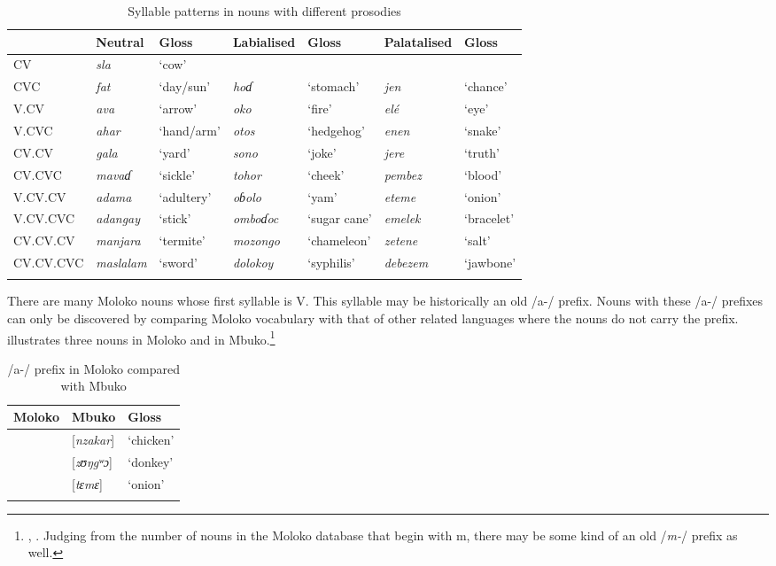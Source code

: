\begin{sidewaystable}
\caption{Syllable patterns in nouns with different prosodies\label{tab:4.24}}
\begin{tabular}{lllllll} \lsptoprule & {Neutral  } & {Gloss} & {Labialised} & {Gloss} & {Palatalised} & {Gloss}\\\midrule
{CV} & \textit{sla} & ‘cow’ &  &  &  & \\
{CVC} & \textit{fat} & ‘day/sun’ & \textit{hoɗ} & ‘stomach’ & \textit{jen} & ‘chance’\\
{V.CV} & \textit{ava} & ‘arrow’ & \textit{oko} & ‘fire’ & \textit{el\'{e}} & ‘eye’\\
{V.CVC} & \textit{ahar} & ‘hand/arm’ & \textit{otos} & ‘hedgehog’ & \textit{enen} & ‘snake’\\
{CV.CV} & \textit{gala} & ‘yard’ & \textit{sono} & ‘joke’ & \textit{jere} & ‘truth’\\
{CV.CVC} & \textit{mavaɗ} & ‘sickle’ & \textit{tohor} & ‘cheek’ & \textit{pembez} & ‘blood’\\
{V.CV.CV} & \textit{adama} & ‘adultery’ & \textit{oɓolo} & ‘yam’ & \textit{eteme} & ‘onion’\\
{V.CV.CVC} & \textit{adangay} & ‘stick’ & \textit{omboɗoc} & ‘sugar cane’ & \textit{emelek} & ‘bracelet’\\
{CV.CV.CV} & \textit{manjara} & ‘termite’ & \textit{mozongo} & ‘chameleon’ & \textit{zetene} & ‘salt’\\
{CV.CV.CVC} & \textit{maslalam} & ‘sword’ & \textit{dolokoy} & ‘syphilis’ & \textit{debezem} & ‘jawbone’\\
\lspbottomrule
\end{tabular}
\end{sidewaystable}

There are many Moloko nouns whose first syllable is V. This syllable may be historically an old /a-/ prefix. Nouns with these /a-/ prefixes can only be discovered by comparing Moloko vocabulary with that of other related languages where the nouns do not carry the prefix.  illustrates three nouns in Moloko and in Mbuko.\footnote{\citet{Mbuagbaw1995}, \citet{Gravina2001}. Judging from the number of nouns in the Moloko database that begin with m, there may be some kind of an old /\textit{m-}/ prefix as well.} 

\begin{table}
\begin{tabular}{lll}
\lsptoprule
{Moloko} & {Mbuko} & {Gloss}\\
\midrule{}  & [\textit{nzakar}]  & ‘chicken’\\ & [\textit{zʊŋgʷɔ}] & ‘donkey’\\ & [\textit{tɛmɛ}] & ‘onion’\\
\lspbottomrule
\end{tabular}
\caption{/a-/ prefix in Moloko compared with Mbuko\label{tab:4.25}}
\end{table}

